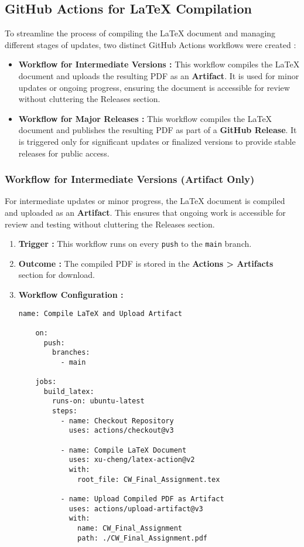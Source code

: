 \documentclass[12pt]{article}
\begin{document}
\subsection{GitHub Actions for LaTeX Compilation}

To streamline the process of compiling the LaTeX document and managing different stages of updates, two distinct GitHub Actions workflows were created :

\begin{itemize}
    \item \textbf{Workflow for Intermediate Versions :}
    This workflow compiles the LaTeX document and uploads the resulting PDF as an \textbf{Artifact}. It is used for minor updates or ongoing progress, ensuring the document is accessible for review without cluttering the Releases section.
    
    \item \textbf{Workflow for Major Releases :}
    This workflow compiles the LaTeX document and publishes the resulting PDF as part of a \textbf{GitHub Release}. It is triggered only for significant updates or finalized versions to provide stable releases for public access.
\end{itemize}

\subsubsection{Workflow for Intermediate Versions (Artifact Only)}

For intermediate updates or minor progress, the LaTeX document is compiled and uploaded as an \textbf{Artifact}. This ensures that ongoing work is accessible for review and testing without cluttering the Releases section.

\begin{enumerate}
    \item \textbf{Trigger :} This workflow runs on every \texttt{push} to the \texttt{main} branch.
    \item \textbf{Outcome :} The compiled PDF is stored in the \textbf{Actions > Artifacts} section for download.
    \item \textbf{Workflow Configuration :}
    \begin{lstlisting}[caption=Workflow for Intermediate Versions]
    name: Compile LaTeX and Upload Artifact

    on:
      push:
        branches:
          - main

    jobs:
      build_latex:
        runs-on: ubuntu-latest
        steps:
          - name: Checkout Repository
            uses: actions/checkout@v3

          - name: Compile LaTeX Document
            uses: xu-cheng/latex-action@v2
            with:
              root_file: CW_Final_Assignment.tex

          - name: Upload Compiled PDF as Artifact
            uses: actions/upload-artifact@v3
            with:
              name: CW_Final_Assignment
              path: ./CW_Final_Assignment.pdf
    \end{lstlisting}
\end{enumerate}
\end{document}
